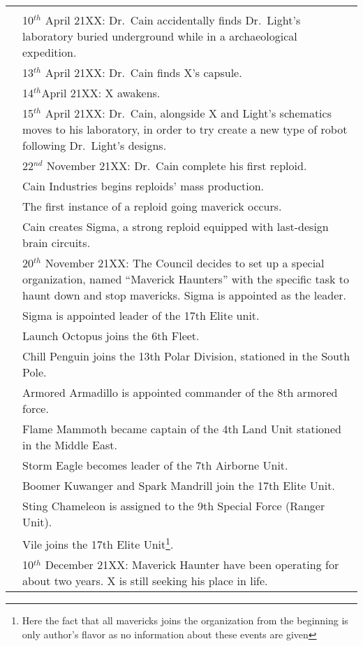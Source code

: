 \begin{tabularx}{\linewidth}{l X}
	\midrule
	\rowcolor{Aquamarine}
	\multicolumn{2}{c}{\textbf{21XX}}\\
	\addlinespace[1.5ex]
	\tabdot&10$^{th}$ April 21XX: Dr.~Cain accidentally finds Dr.~Light's laboratory buried underground while in a archaeological expedition.\\
	\tabdot&13$^{th}$ April 21XX: Dr.~Cain finds X's capsule.\\ 
	\tabdot& 14$^{th} $April 21XX: X awakens.\\
	\tabdot& 15$^{th}$ April 21XX: Dr.~Cain, alongside X and Light's schematics moves to his laboratory, in order to try create a new type of robot following Dr.~Light's designs.\\
	\tabdot& 22$^{nd}$ November 21XX: Dr.~Cain complete his first reploid.\\
	\tabdot& Cain Industries begins reploids' mass production.\\
	\tabdot& The first instance of a reploid going maverick occurs.\\
	\tabdot& Cain creates Sigma, a strong reploid equipped with last-design brain circuits.\\
	\tabdot& 20$^{th}$ November 21XX: The Council decides to set up a special organization, named ``Maverick Haunters'' with the specific task to haunt down and stop mavericks. Sigma is appointed as the leader.\\
	\tabdot& Sigma is appointed leader of the 17th Elite unit.\\
	\tabdot& Launch Octopus joins the 6th Fleet.\\
	\tabdot& Chill Penguin joins the 13th Polar Division, stationed in the South Pole.\\
	\tabdot& Armored Armadillo is appointed commander of the 8th armored force.\\
	\tabdot & Flame Mammoth became captain of the 4th Land Unit stationed in the Middle East.\\
	\tabdot& Storm Eagle becomes leader of the 7th Airborne Unit.\\
	\tabdot& Boomer Kuwanger and Spark Mandrill join the 17th Elite Unit.\\
	\tabdot& Sting Chameleon is assigned to the 9th Special Force (Ranger Unit).\\
	\tabdot& Vile joins the 17th Elite Unit\footnote{Here the fact that all mavericks joins the organization from the beginning is only author's flavor as no information about these events are given}.\\
	\tabdot& 10$^{th}$ December 21XX: Maverick Haunter have been operating for about two years. X is still seeking his place in life.\\

\end{tabularx}

